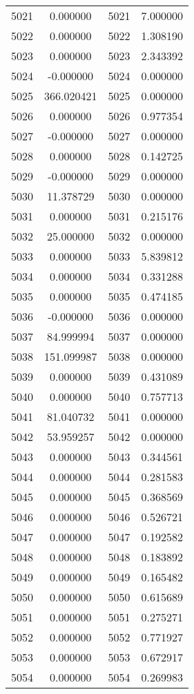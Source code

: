 \documentclass[12pt]{article}
\begin{document}
\begin{longtable}{@{}cccc@{}}
5021 & 0.000000 & 5021 & 7.000000 \\
5022 & 0.000000 & 5022 & 1.308190 \\
5023 & 0.000000 & 5023 & 2.343392 \\
5024 & -0.000000 & 5024 & 0.000000 \\
5025 & 366.020421 & 5025 & 0.000000 \\
5026 & 0.000000 & 5026 & 0.977354 \\
5027 & -0.000000 & 5027 & 0.000000 \\
5028 & 0.000000 & 5028 & 0.142725 \\
5029 & -0.000000 & 5029 & 0.000000 \\
5030 & 11.378729 & 5030 & 0.000000 \\
5031 & 0.000000 & 5031 & 0.215176 \\
5032 & 25.000000 & 5032 & 0.000000 \\
5033 & 0.000000 & 5033 & 5.839812 \\
5034 & 0.000000 & 5034 & 0.331288 \\
5035 & 0.000000 & 5035 & 0.474185 \\
5036 & -0.000000 & 5036 & 0.000000 \\
5037 & 84.999994 & 5037 & 0.000000 \\
5038 & 151.099987 & 5038 & 0.000000 \\
5039 & 0.000000 & 5039 & 0.431089 \\
5040 & 0.000000 & 5040 & 0.757713 \\
5041 & 81.040732 & 5041 & 0.000000 \\
5042 & 53.959257 & 5042 & 0.000000 \\
5043 & 0.000000 & 5043 & 0.344561 \\
5044 & 0.000000 & 5044 & 0.281583 \\
5045 & 0.000000 & 5045 & 0.368569 \\
5046 & 0.000000 & 5046 & 0.526721 \\
5047 & 0.000000 & 5047 & 0.192582 \\
5048 & 0.000000 & 5048 & 0.183892 \\
5049 & 0.000000 & 5049 & 0.165482 \\
5050 & 0.000000 & 5050 & 0.615689 \\
5051 & 0.000000 & 5051 & 0.275271 \\
5052 & 0.000000 & 5052 & 0.771927 \\
5053 & 0.000000 & 5053 & 0.672917 \\
5054 & 0.000000 & 5054 & 0.269983 \\

\end{longtable}
\end{document}
